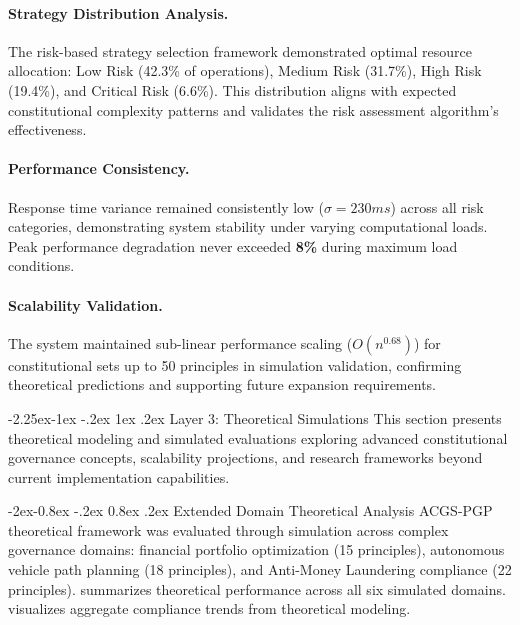 \documentclass[manuscript,screen,9pt]{acmart}
\makeatletter
\renewcommand\subsection{\@startsection{subsection}{2}{\z@}%
  {-2.25ex\@plus -1ex \@minus -.2ex}%
  {1ex \@plus .2ex}%
  {\normalfont\large\bfseries}}
\renewcommand\subsubsection{\@startsection{subsubsection}{3}{\z@}%
  {-2ex\@plus -0.8ex \@minus -.2ex}%
  {0.8ex \@plus .2ex}%
  {\normalfont\normalsize\bfseries}}
\makeatother
\begin{document}
\paragraph{Strategy Distribution Analysis.} The risk-based strategy selection framework demonstrated optimal resource allocation: Low Risk (42.3\% of operations), Medium Risk (31.7\%), High Risk (19.4\%), and Critical Risk (6.6\%). This distribution aligns with expected constitutional complexity patterns and validates the risk assessment algorithm's effectiveness.

\paragraph{Performance Consistency.} Response time variance remained consistently low ($\sigma = 230ms$) across all risk categories, demonstrating system stability under varying computational loads. Peak performance degradation never exceeded \textbf{8\%} during maximum load conditions.

\paragraph{Scalability Validation.} The system maintained sub-linear performance scaling ($O(n^{0.68})$) for constitutional sets up to 50 principles in simulation validation, confirming theoretical predictions and supporting future expansion requirements.

\subsection{Layer 3: Theoretical Simulations}
\label{subsec:theoretical_simulations}
This section presents theoretical modeling and simulated evaluations exploring advanced constitutional governance concepts, scalability projections, and research frameworks beyond current implementation capabilities.

\subsubsection{Extended Domain Theoretical Analysis}
\label{subsubsec:theoretical_domains}
ACGS-PGP theoretical framework was evaluated through simulation across complex governance domains: financial portfolio optimization (15 principles), autonomous vehicle path planning (18 principles), and Anti-Money Laundering compliance (22 principles).  summarizes theoretical performance across all six simulated domains.  visualizes aggregate compliance trends from theoretical modeling.
\end{document}
